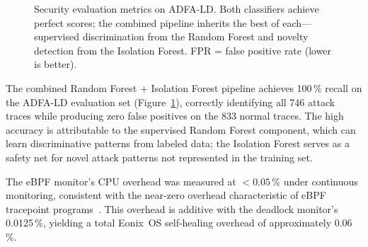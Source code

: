 \documentclass[11pt,letterpaper]{article}
\begin{document}
\begin{figure}[h]
\centering
{}
\caption{Security evaluation metrics on ADFA-LD.  Both classifiers
  achieve perfect scores; the combined pipeline inherits the best of
  each---supervised discrimination from the Random Forest and novelty
  detection from the Isolation Forest.  FPR = false positive rate
  (lower is better).}
\label{fig:detection-ebpf}
\end{figure}

The combined Random Forest + Isolation Forest pipeline achieves
100\,\% recall on the ADFA-LD evaluation set (Figure~\ref{fig:detection-ebpf}),
correctly identifying all
746 attack traces while producing zero false positives on the 833
normal traces.  The high accuracy is attributable to the supervised
Random Forest component, which can learn discriminative patterns from
labeled data; the Isolation Forest serves as a safety net for novel
attack patterns not represented in the training set.

The eBPF monitor's CPU overhead was measured at $< 0.05$\,\% under
continuous monitoring, consistent with the near-zero overhead
characteristic of eBPF tracepoint programs~\cite{mccanne1993}.  This
overhead is additive with the deadlock monitor's 0.0125\,\%, yielding a
total Eonix~OS self-healing overhead of approximately 0.06\,\%.

\end{document}
